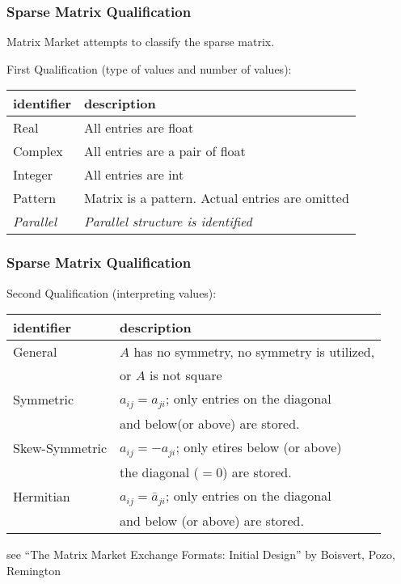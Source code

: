 \documentclass[10pt]{beamer}
\begin{document}
\begin{frame}
\frametitle{Sparse Matrix Qualification}
Matrix Market attempts to classify the sparse matrix.

First Qualification (type of values and number of values):
\begin{center}
  \begin{tabular}{l l}\hline
  identifier & description\\\hline
  Real & All entries are float\\
  Complex & All entries are a pair of float\\
  Integer & All entries are int\\
  Pattern & Matrix is a pattern.  Actual entries are omitted\\
  \emph{Parallel} & \emph{Parallel structure is identified}\\\hline
  \end{tabular}
\end{center}
\end{frame}
\begin{frame}
\frametitle{Sparse Matrix Qualification}
Second Qualification (interpreting values):
\begin{center}
  \begin{tabular}{l l}\hline
  identifier & description\\\hline
  General & $A$ has no symmetry, no symmetry is utilized, \\
          & or $A$ is not square\\
  Symmetric & $a_{ij}=a_{ji}$; only entries on the diagonal \\
            & and below(or above) are stored.\\
  Skew-Symmetric & $a_{ij}=-a_{ji}$; only etires below (or above) \\
                  & the diagonal ($=0$) are stored.\\
  Hermitian & $a_{ij}=\bar{a}_{ji}$; only entries on the diagonal \\
                & and below (or above) are stored.\\
  \end{tabular}
\end{center}

\bigskip
\tiny{ see ``The Matrix Market Exchange Formats: Initial Design'' by
Boisvert, Pozo, Remington}
\end{frame}
\end{document}
